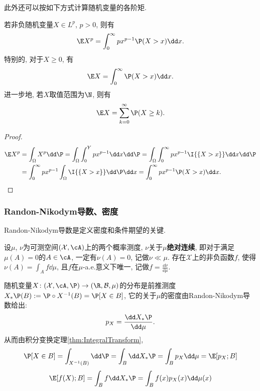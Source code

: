 此外还可以按如下方式计算随机变量的各阶矩. 
\begin{lemma}\label{lemma:trickOfExpectation}
	若非负随机变量$X \in L^p$, $p > 0$, 则有
	\begin{equation}
		\E X^p = \int_0^{\infty} p x^{p-1} \P(X > x) \dd x. 
	\end{equation}
	特别的, 对于$X \geq 0$, 有
	\begin{equation*}
		\E X = \int_0^{\infty} \P(X > x) \dd x. 
	\end{equation*}
	进一步地, 若$X$取值范围为$\N$, 则有
	\begin{equation*}
		\E X = \sum_{k=0}^{\infty} \P(X \geq k). 
	\end{equation*}
\end{lemma}
\begin{proof}
	\begin{align*}
		\E X^p 
		&= \int_\Omega X^p \dd \P 
		= \int_\Omega \int_0^Y p x^{p-1} \dd x \dd \P 
		= \int_\Omega \int_0^{\infty} p x^{p-1} \I{\{X > x\}} \dd x \dd \P \\
		&= \int_0^{\infty} p x^{p-1} \int_\Omega \I{\{X > x\}} \dd \P \dd x
		= \int_0^{\infty} p x^{p-1} \P(X > x) \dd x.
	\end{align*}
\end{proof}


\subsubsection{Randon-Nikodym导数、密度}

Randon-Nikodym导数是定义密度和条件期望的关键. 

\begin{theorem}
	设$\mu$, $\nu$为可测空间$(\mathcal{X}, \cA)$上的两个概率测度, $\nu$关于$\mu$\textbf{绝对连续}, 即对于满足$\mu(A) = 0$的$A \in \cA$, 一定有$\nu(A) = 0$, 记做$\nu \ll \mu$. 
	存在$\mathcal{X}$上的非负函数$f$, 使得$\nu(A) = \int_A f \dd \mu$, 且$f$在$\mu$-a.e.意义下唯一, 记做$f = \frac{\dd \nu}{\dd \mu}$. 
\end{theorem}

\begin{example}[分布的密度]
	随机变量$X \colon (\mathcal{X}, \cA, \P) \to (\R, \mathcal{B}, \mu)$的分布是前推测度$X_* \P (B) := \P \circ X^{-1} (B) = \P[X \in B]$, 它的关于$\mu$的密度由Randon-Nikodym导数给出: 
	\begin{equation*}
		p_X = \frac{\dd X_* \P}{\dd \mu}. 
	\end{equation*}
	从而由积分变换定理\ref{thm:IntegralTransform}, 
	\begin{equation*}
		\P[X \in B] 
		= \int_{X^{-1}(B)} \dd \P 
		= \int_B \dd X_* \P 
		= \int_B p_X \dd \mu
		= \E[p_X; B]
	\end{equation*}
	\begin{equation*}
		\E[f(X); B]
		= \int_B f \dd X_* \P 
		= \int_B f(x) p_X(x) \dd \mu(x)
	\end{equation*}
\end{example}

